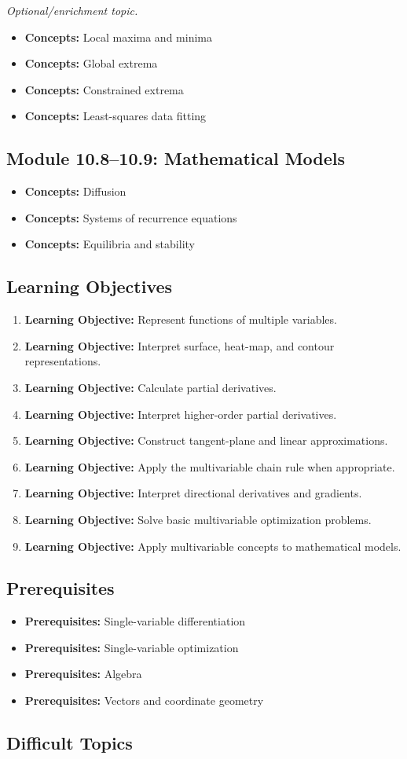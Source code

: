 \documentclass[11pt]{article}
\newcommand{\objective}[1]{\item \textbf{Learning Objective:} #1}
\newcommand{\concept}[1]{\item \textbf{Concepts:} #1}
\newcommand{\prereq}[1]{\item \textbf{Prerequisites:} #1}
\begin{document}
\textit{Optional/enrichment topic.}

\begin{itemize}
    \concept{Local maxima and minima}
    \concept{Global extrema}
    \concept{Constrained extrema}
    \concept{Least-squares data fitting}
\end{itemize}

\subsection{Module 10.8--10.9: Mathematical Models}

\begin{itemize}
    \concept{Diffusion}
    \concept{Systems of recurrence equations}
    \concept{Equilibria and stability}
\end{itemize}

\subsection{Learning Objectives}

\begin{enumerate}
    \objective{Represent functions of multiple variables.}
    \objective{Interpret surface, heat-map, and contour representations.}
    \objective{Calculate partial derivatives.}
    \objective{Interpret higher-order partial derivatives.}
    \objective{Construct tangent-plane and linear approximations.}
    \objective{Apply the multivariable chain rule when appropriate.}
    \objective{Interpret directional derivatives and gradients.}
    \objective{Solve basic multivariable optimization problems.}
    \objective{Apply multivariable concepts to mathematical models.}
\end{enumerate}

\subsection{Prerequisites}

\begin{itemize}
    \prereq{Single-variable differentiation}
    \prereq{Single-variable optimization}
    \prereq{Algebra}
    \prereq{Vectors and coordinate geometry}
\end{itemize}

\subsection{Difficult Topics}
\end{document}
